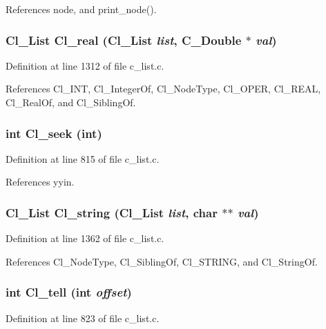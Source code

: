 References node, and print\_\-node().
\subsubsection{\setlength{\rightskip}{0pt plus 5cm}\bf{Cl\_\-List} Cl\_\-real (\bf{Cl\_\-List} {\em list}, \bf{C\_\-Double} $\ast$ {\em val})}\label{c__list_8h_82c85c1fbf57c6bbe31a4022fcd9da92}




Definition at line 1312 of file c\_\-list.c.

References Cl\_\-INT, Cl\_\-Integer\-Of, Cl\_\-Node\-Type, Cl\_\-OPER, Cl\_\-REAL, Cl\_\-Real\-Of, and Cl\_\-Sibling\-Of.
\subsubsection{\setlength{\rightskip}{0pt plus 5cm}int Cl\_\-seek (int)}\label{c__list_8h_ced7bb793c546f3aa229ee4a837cbbd4}




Definition at line 815 of file c\_\-list.c.

References yyin.
\subsubsection{\setlength{\rightskip}{0pt plus 5cm}\bf{Cl\_\-List} Cl\_\-string (\bf{Cl\_\-List} {\em list}, char $\ast$$\ast$ {\em val})}\label{c__list_8h_d970539c2fc1445ccc3e49fa20b4d42b}




Definition at line 1362 of file c\_\-list.c.

References Cl\_\-Node\-Type, Cl\_\-Sibling\-Of, Cl\_\-STRING, and Cl\_\-String\-Of.
\subsubsection{\setlength{\rightskip}{0pt plus 5cm}int Cl\_\-tell (int {\em offset})}\label{c__list_8h_ccfa9ee87e61a5dd4fe7e357d4580294}




Definition at line 823 of file c\_\-list.c.

